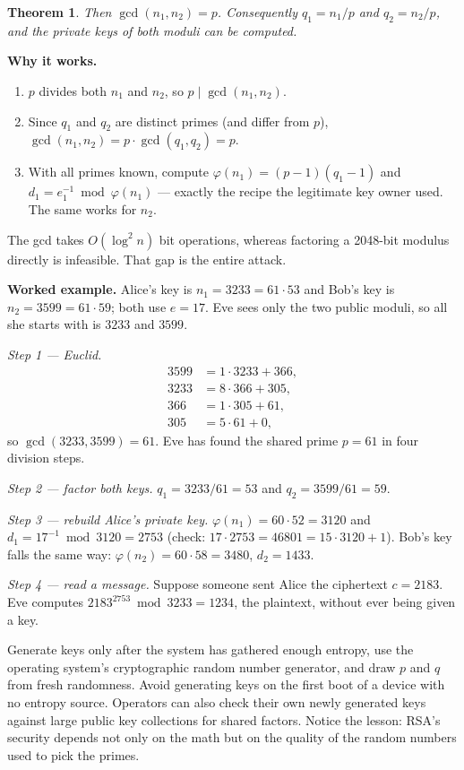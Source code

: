 \documentclass[11pt]{article}
\newtheorem{theorem}{Theorem}
\begin{document}
\begin{theorem}
Then $\gcd(n_1,n_2)=p$. Consequently $q_1=n_1/p$ and $q_2=n_2/p$, and the private keys of \emph{both} moduli can be computed.
\end{theorem}

\textbf{Why it works.}
\begin{enumerate}[nosep]
\item $p$ divides both $n_1$ and $n_2$, so $p\mid\gcd(n_1,n_2)$.
\item Since $q_1$ and $q_2$ are distinct primes (and differ from $p$), $\gcd(n_1,n_2)=p\cdot\gcd(q_1,q_2)=p$.
\item With all primes known, compute $\varphi(n_1)=(p-1)(q_1-1)$ and $d_1=e_1^{-1}\bmod\varphi(n_1)$ --- exactly the recipe the legitimate key owner used. The same works for $n_2$.
\end{enumerate}
The gcd takes $O(\log^2 n)$ bit operations, whereas factoring a 2048-bit modulus directly is infeasible. That gap is the entire attack.

\textbf{Worked example.} Alice's key is $n_1=3233=61\cdot53$ and Bob's key is $n_2=3599=61\cdot59$; both use $e=17$. Eve sees only the two public moduli, so all she starts with is $3233$ and $3599$.

\emph{Step 1 --- Euclid.}
\begin{align*}
3599 &= 1\cdot3233+366,\\
3233 &= 8\cdot366+305,\\
366 &= 1\cdot305+61,\\
305 &= 5\cdot61+0,
\end{align*}
so $\gcd(3233,3599)=61$. Eve has found the shared prime $p=61$ in four division steps.

\emph{Step 2 --- factor both keys.} $q_1=3233/61=53$ and $q_2=3599/61=59$.

\emph{Step 3 --- rebuild Alice's private key.} $\varphi(n_1)=60\cdot52=3120$ and $d_1=17^{-1}\bmod3120=2753$ (check: $17\cdot2753=46801=15\cdot3120+1$). Bob's key falls the same way: $\varphi(n_2)=60\cdot58=3480$, $d_2=1433$.

\emph{Step 4 --- read a message.} Suppose someone sent Alice the ciphertext $c=2183$. Eve computes $2183^{2753}\bmod3233=1234$, the plaintext, without ever being given a key.

\begin{fixbox}
Generate keys only after the system has gathered enough entropy, use the operating system's cryptographic random number generator, and draw $p$ and $q$ from fresh randomness. Avoid generating keys on the first boot of a device with no entropy source. Operators can also check their own newly generated keys against large public key collections for shared factors. Notice the lesson: RSA's security depends not only on the math but on the quality of the random numbers used to pick the primes.
\end{fixbox}
\end{document}
